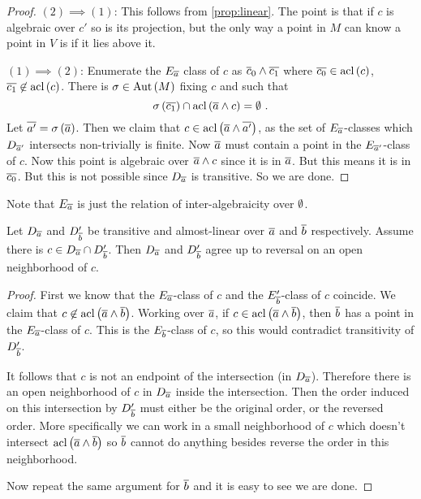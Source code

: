 \documentclass{amsart}
\begin{document}
\begin{proof}
$\left(2\right)\implies \left(1\right)$: 
This follows from \cref{prop:linear}.
The point is that if $c$ is algebraic over $c'$ so is its
projection, but the only way a point in $M$ can know a point in $V$ is if it lies above
it.

$\left(1\right)\implies \left(2\right)$: Enumerate the $E_{\overline{a}}$ class of $c$ as
$\overline{c}_0\land \overline{c_1}$ where $\overline{c_0}\in \operatorname{acl}\left(c\right)$,
$\overline{c_1}\not\in \operatorname{acl}\left(c\right)$. 
There is $\sigma\in \operatorname{Aut}\left(M\right)$ fixing $c$
and such that 
\begin{equation}
\sigma\left(\overline{c_1}\right)\cap \operatorname{acl}\left(\overline{a}\land c\right) = \emptyset \ .
\end{equation}
Let $\overline{a'} = \sigma\left(\overline{a}\right)$. 
Then we claim that $c\in \operatorname{acl}\left(\overline{a}\land \overline{a'}\right)$, as the set of
$E_{\overline{a}}$-classes which $D_{\overline{a}'}$ intersects non-trivially is finite.
Now $\overline{a}$ must contain a point in the $E_{\overline{a}'}$-class of $c$. Now
this point is algebraic over $\overline{a}\land c$ since it is in $\overline{a}$.
But this means it is in $\overline{c_0}$. But this is not possible since $D_{\overline{a}}$ is
transitive. So we are done.
\end{proof}

Note that $E_{\overline{a}}$ is just the relation of inter-algebraicity over $\emptyset$.

\begin{lem}
Let $D_{\overline{a}}$ and $D'_{\overline{b}}$ be transitive and almost-linear over $\overline{a}$
and $\overline{b}$ respectively. 
Assume there is $c\in D_{\overline{a}}\cap D'_{\overline{b}}$. Then
$D_{\overline{a}}$ and $D'_{\overline{b}}$ agree up to reversal on an open neighborhood of $c$.
\end{lem}

\begin{proof}
First we know that the $E_{\overline{a}}$-class of $c$ and the $E'_{\overline{b}}$-class of $c$
coincide. 
We claim that $c\not\in \operatorname{acl}\left(\overline{a}\land \overline{b}\right)$. 
Working over $\overline{a}$, if $c\in \operatorname{acl}\left(\overline{a}\land\overline{b}\right)$, then
$\overline{b}$ has a point in the $E_{\overline{a}}$-class of $c$. This is the
$E_{\overline{b}}$-class of $c$, so this would contradict transitivity of $D'_{\overline{b}}$.

It follows that $c$ is not an endpoint of the intersection (in $D_{\overline{a}}$). 
Therefore there is an open neighborhood of $c$ in $D_{\overline{a}}$ inside the intersection.
Then the order induced on this intersection by $D'_{\overline{b}}$ must either be the original order, or
the reversed order. 
More specifically we can work in a small neighborhood of $c$ which doesn't intersect
$\operatorname{acl}\left(\overline{a}\land\overline{b}\right)$ so $\overline{b}$ cannot do anything besides
reverse the order in this neighborhood.

Now repeat the same argument for $\overline{b}$ and it is easy to see we are done.
\end{proof}
\end{document}
